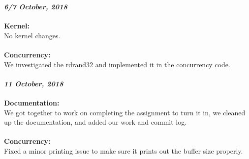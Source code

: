 \documentclass{article}
\begin{document}
\noindent
\textit{\textbf{6/7 October, 2018}} \\\\
\textbf{Kernel:} \\
\indent No kernel changes.
\\\\
\textbf{Concurrency:} \\
\indent We investigated the rdrand32 and implemented it in the concurrency code.
\\\\

\noindent
\textit{\textbf{11 October, 2018}} \\\\
\textbf{Documentation:} \\
\indent We got together to work on completing the assignment to turn it in, we cleaned up the documentation, and added our work and commit log.
\\\\
\textbf{Concurrency:} \\
\indent Fixed a minor printing issue to make sure it prints out the buffer size properly.
\\\\

\end{document}
